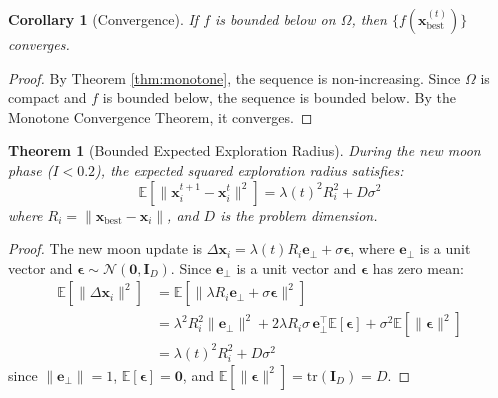 \documentclass[review]{elsarticle}
\newtheorem{theorem}{Theorem}
\newtheorem{corollary}{Corollary}
\theoremstyle{definition}
\begin{document}
\begin{corollary}[Convergence]
\label{cor:conv}
If $f$ is bounded below on $\Omega$, then $\{f(\mathbf{x}_{\mathrm{best}}^{(t)})\}$ converges.
\end{corollary}
\begin{proof}
By Theorem \ref{thm:monotone}, the sequence is non-increasing. Since $\Omega$ is compact and $f$ is bounded below, the sequence is bounded below. By the Monotone Convergence Theorem, it converges.
\end{proof}

\begin{theorem}[Bounded Expected Exploration Radius]
\label{thm:radius}
During the new moon phase ($I < 0.2$), the expected squared exploration radius satisfies:
\begin{equation}
\mathbb{E}\left[\|\mathbf{x}_i^{t+1} - \mathbf{x}_i^t\|^2\right] = \lambda(t)^2 R_i^2 + D \sigma^2
\end{equation}
where $R_i = \|\mathbf{x}_{\mathrm{best}} - \mathbf{x}_i\|$, and $D$ is the problem dimension.
\end{theorem}
\begin{proof}
The new moon update is $\Delta\mathbf{x}_i = \lambda(t) R_i \mathbf{e}_\perp + \sigma \boldsymbol{\epsilon}$, where $\mathbf{e}_\perp$ is a unit vector and $\boldsymbol{\epsilon} \sim \mathcal{N}(\mathbf{0}, \mathbf{I}_D)$. Since $\mathbf{e}_\perp$ is a unit vector and $\boldsymbol{\epsilon}$ has zero mean:
\begin{align*}
\mathbb{E}[\|\Delta\mathbf{x}_i\|^2] &= \mathbb{E}[\|\lambda R_i \mathbf{e}_\perp + \sigma \boldsymbol{\epsilon}\|^2] \\
&= \lambda^2 R_i^2 \|\mathbf{e}_\perp\|^2 + 2\lambda R_i \sigma \, \mathbf{e}_\perp^\top \mathbb{E}[\boldsymbol{\epsilon}] + \sigma^2 \mathbb{E}[\|\boldsymbol{\epsilon}\|^2] \\
&= \lambda(t)^2 R_i^2 + D\sigma^2
\end{align*}
since $\|\mathbf{e}_\perp\| = 1$, $\mathbb{E}[\boldsymbol{\epsilon}] = \mathbf{0}$, and $\mathbb{E}[\|\boldsymbol{\epsilon}\|^2] = \mathrm{tr}(\mathbf{I}_D) = D$.
\end{proof}
\end{document}
